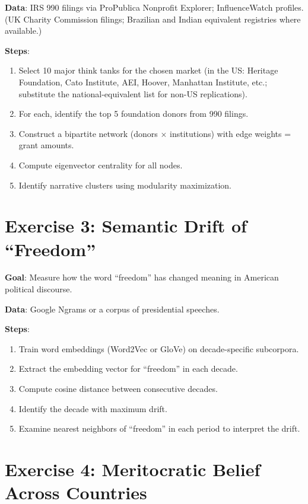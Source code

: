 \textbf{Data}: IRS 990 filings via ProPublica Nonprofit Explorer; InfluenceWatch profiles. (UK Charity Commission filings; Brazilian and Indian equivalent registries where available.)

\textbf{Steps}:
\begin{enumerate}[nosep]
  \item Select 10 major think tanks for the chosen market (in the US: Heritage Foundation, Cato Institute, AEI, Hoover, Manhattan Institute, etc.; substitute the national-equivalent list for non-US replications).
  \item For each, identify the top 5 foundation donors from 990 filings.
  \item Construct a bipartite network (donors $\times$ institutions) with edge weights = grant amounts.
  \item Compute eigenvector centrality for all nodes.
  \item Identify narrative clusters using modularity maximization.
\end{enumerate}

\section*{Exercise 3: Semantic Drift of ``Freedom''}

\textbf{Goal}: Measure how the word ``freedom'' has changed meaning in American political discourse.

\textbf{Data}: Google Ngrams or a corpus of presidential speeches.

\textbf{Steps}:
\begin{enumerate}[nosep]
  \item Train word embeddings (Word2Vec or GloVe) on decade-specific subcorpora.
  \item Extract the embedding vector for ``freedom'' in each decade.
  \item Compute cosine distance between consecutive decades.
  \item Identify the decade with maximum drift.
  \item Examine nearest neighbors of ``freedom'' in each period to interpret the drift.
\end{enumerate}

\section*{Exercise 4: Meritocratic Belief Across Countries}

